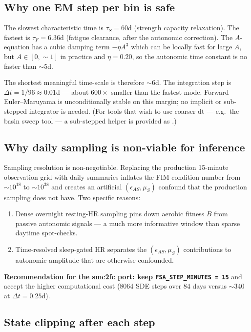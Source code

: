 \documentclass[11pt,a4paper]{article}
\theoremstyle{definition}
\begin{document}
\subsection{Why one EM step per bin is safe}

The slowest characteristic time is $\tau_S = 60$d (strength capacity
relaxation). The fastest is $\tau_F = 6.36$d (fatigue clearance, after
the autonomic correction). The $A$-equation has a cubic damping term
$-\eta A^3$ which can be locally fast for large $A$, but $A \in [0,
\sim 1]$ in practice and $\eta = 0.20$, so the autonomic time constant
is no faster than $\sim 5$d.

The shortest meaningful time-scale is therefore $\sim 6$d. The
integration step is $\Delta t = 1/96 \approx 0.01$d --- about
$600\times$ smaller than the fastest mode. Forward Euler--Maruyama is
unconditionally stable on this margin; no implicit or sub-stepped
integrator is needed. (For tools that wish to use coarser dt --- e.g.\
the basin sweep tool --- a sub-stepped helper is provided as
.)

\subsection{Why daily sampling is non-viable for inference}

Sampling resolution is non-negotiable. Replacing the production
15-minute observation grid with daily summaries inflates the FIM
condition number from $\sim 10^{18}$ to $\sim 10^{38}$ and creates an
artificial $(\epsilon_{AS}, \mu_S)$ confound that the production
sampling does not have. Two specific reasons:

\begin{enumerate}
  \item Dense overnight resting-HR sampling pins down aerobic fitness
        $B$ from passive autonomic signals --- a much more informative
        window than sparse daytime spot-checks.
  \item Time-resolved sleep-gated HR separates the
        $(\epsilon_{AS}, \mu_S)$ contributions to autonomic
        amplitude that are otherwise confounded.
\end{enumerate}

\textbf{Recommendation for the smc2fc port: keep \texttt{FSA\_STEP\_MINUTES = 15}}
and accept the higher computational cost (8064 SDE steps over 84 days
versus $\sim 340$ at $\Delta t = 0.25$d).

\subsection{State clipping after each step}
\end{document}
